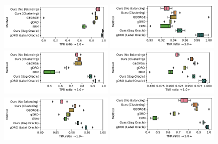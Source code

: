 \begin{figure}[t]
  \centering
 \includegraphics[width=0.49\textwidth]{supmatch/figures/celeba/no_smiling_females/celeba_gender_smiling_tprr.pdf}
 \includegraphics[width=0.49\textwidth]{supmatch/figures/celeba/no_smiling_females/celeba_gender_smiling_tnrr.pdf}
 \includegraphics[width=0.49\textwidth]{supmatch/figures/celeba/no_smiling_males/celeba_gender_smiling_tprr.pdf}
 \includegraphics[width=0.49\textwidth]{supmatch/figures/celeba/no_smiling_males/celeba_gender_smiling_tnrr.pdf}
 \includegraphics[width=0.49\textwidth]{supmatch/figures/celeba/no_unsmiling_females/celeba_gender_smiling_tprr.pdf}
 \includegraphics[width=0.49\textwidth]{supmatch/figures/celeba/no_unsmiling_females/celeba_gender_smiling_tnrr.pdf}

\end{figure}

